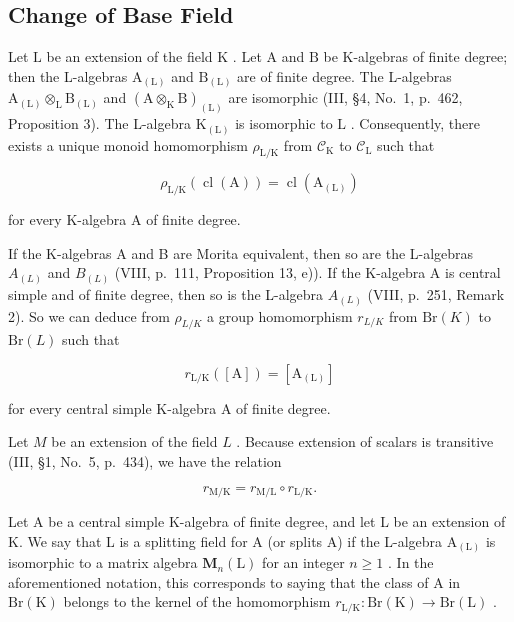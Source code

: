 \subsection{Change of Base Field}

Let \(\mathrm{L}\) be an extension of the field \(\mathrm{K}\) . Let \(\mathrm{A}\) and \(\mathrm{B}\) be K-algebras of finite degree; then the L-algebras \(\mathrm{A}_{(\mathrm{L})}\) and \(\mathrm{B}_{(\mathrm{L})}\) are of finite degree. The L-algebras \(\mathrm{A}_{(\mathrm{L})} \otimes_{\mathrm{L}} \mathrm{B}_{(\mathrm{L})}\) and \((\mathrm{A} \otimes_{\mathrm{K}} \mathrm{B})_{(\mathrm{L})}\) are isomorphic (III, §4, No.~1, p.~462, Proposition 3). The L-algebra \(\mathrm{K}_{(\mathrm{L})}\) is isomorphic to \(\mathrm{L}\) . Consequently, there exists a unique monoid homomorphism \(\rho_{\mathrm{L/K}}\) from \(\mathcal{C}_{\mathrm{K}}\) to \(\mathcal{C}_{\mathrm{L}}\) such that

\[
\rho_ {\mathrm{L/K}} (\operatorname{cl} (\mathrm{A})) = \operatorname{cl} (\mathrm{A} _ {(\mathrm{L})})\tag{3}
\]

for every K-algebra A of finite degree.

If the K-algebras A and B are Morita equivalent, then so are the L-algebras \(A_{(L)}\) and \(B_{(L)}\) (VIII, p.~111, Proposition 13, e)). If the K-algebra A is central simple and of finite degree, then so is the L-algebra \(A_{(L)}\) (VIII, p.~251, Remark 2). So we can deduce from \(\rho_{L/K}\) a group homomorphism \(r_{L/K}\) from \(\mathrm{Br}(K)\) to \(\mathrm{Br}(L)\) such that

\[
r _ {\mathrm{L/K}} ([ \mathrm{A} ]) = [ \mathrm{A} _ {(\mathrm{L})} ]\tag{4}
\]

for every central simple K-algebra A of finite degree.

Let \(M\) be an extension of the field \(L\) . Because extension of scalars is transitive (III, §1, No.~5, p.~434), we have the relation

\[
r _ {\mathrm{M/K}} = r _ {\mathrm{M/L}} \circ r _ {\mathrm{L/K}}.\tag{5}
\]

Let A be a central simple K-algebra of finite degree, and let L be an extension of K. We say that L is a splitting field for A (or splits A) if the L-algebra \(\mathrm{A}_{(\mathrm{L})}\) is isomorphic to a matrix algebra \(\mathbf{M}_{n}(\mathrm{L})\) for an integer \(n \geqslant 1\) . In the aforementioned notation, this corresponds to saying that the class of A in \(\mathrm{Br}(\mathrm{K})\) belongs to the kernel of the homomorphism \(r_{\mathrm{L/K}} : \mathrm{Br}(\mathrm{K}) \to \mathrm{Br}(\mathrm{L})\) .

